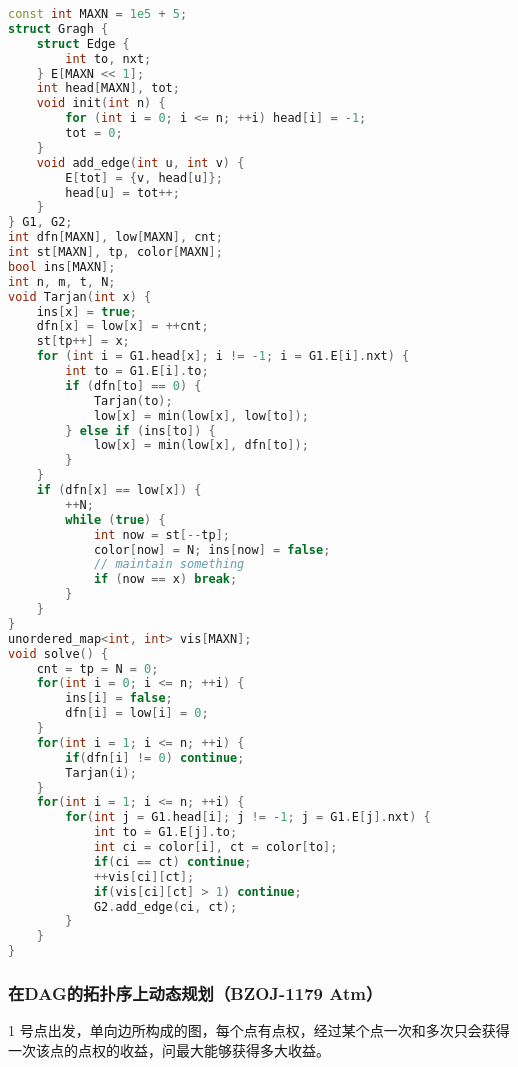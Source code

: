 \begin{lstlisting}[language=C++]
const int MAXN = 1e5 + 5;
struct Gragh {
    struct Edge {
        int to, nxt;
    } E[MAXN << 1];
    int head[MAXN], tot;
    void init(int n) {
        for (int i = 0; i <= n; ++i) head[i] = -1;
        tot = 0;
    }
    void add_edge(int u, int v) {
        E[tot] = {v, head[u]};
        head[u] = tot++;
    }
} G1, G2;
int dfn[MAXN], low[MAXN], cnt;
int st[MAXN], tp, color[MAXN];
bool ins[MAXN];
int n, m, t, N;
void Tarjan(int x) {
    ins[x] = true;
    dfn[x] = low[x] = ++cnt;
    st[tp++] = x;
    for (int i = G1.head[x]; i != -1; i = G1.E[i].nxt) {
        int to = G1.E[i].to;
        if (dfn[to] == 0) {
            Tarjan(to);
            low[x] = min(low[x], low[to]);
        } else if (ins[to]) {
            low[x] = min(low[x], dfn[to]);
        }
    }
    if (dfn[x] == low[x]) {
        ++N;
        while (true) {
            int now = st[--tp];
            color[now] = N; ins[now] = false;
            // maintain something
            if (now == x) break;
        }
    }
}
unordered_map<int, int> vis[MAXN];
void solve() {
    cnt = tp = N = 0;
    for(int i = 0; i <= n; ++i) {
        ins[i] = false;
        dfn[i] = low[i] = 0;
    }
    for(int i = 1; i <= n; ++i) {
        if(dfn[i] != 0) continue;
        Tarjan(i);
    }
    for(int i = 1; i <= n; ++i) {
        for(int j = G1.head[i]; j != -1; j = G1.E[j].nxt) {
            int to = G1.E[j].to;
            int ci = color[i], ct = color[to];
            if(ci == ct) continue;
            ++vis[ci][ct];
            if(vis[ci][ct] > 1) continue;
            G2.add_edge(ci, ct);
        }
    }
}
\end{lstlisting}

\subsubsection{在DAG的拓扑序上动态规划（BZOJ-1179 Atm）}

1 号点出发，单向边所构成的图，每个点有点权，经过某个点一次和多次只会获得一次该点的点权的收益，问最大能够获得多大收益。

